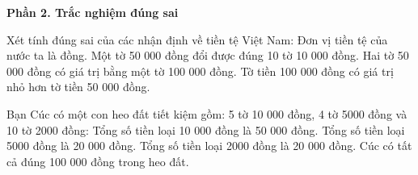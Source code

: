 \textbf{Phần 2. Trắc nghiệm đúng sai}

\begin{ex} %
Xét tính đúng sai của các nhận định về tiền tệ Việt Nam:
\choiceTF
{\True Đơn vị tiền tệ của nước ta là đồng.}
{Một tờ 50 000 đồng đổi được đúng 10 tờ 10 000 đồng.}
{\True Hai tờ 50 000 đồng có giá trị bằng một tờ 100 000 đồng.}
{Tờ tiền 100 000 đồng có giá trị nhỏ hơn tờ tiền 50 000 đồng.}
\end{ex}

\begin{ex} %
Bạn Cúc có một con heo đất tiết kiệm gồm: 5 tờ 10 000 đồng, 4 tờ 5000 đồng và 10 tờ 2000 đồng:
\choiceTF
{\True Tổng số tiền loại 10 000 đồng là 50 000 đồng.}
{\True Tổng số tiền loại 5000 đồng là 20 000 đồng.}
{\True Tổng số tiền loại 2000 đồng là 20 000 đồng.}
{Cúc có tất cả đúng 100 000 đồng trong heo đất.}
\end{ex}

